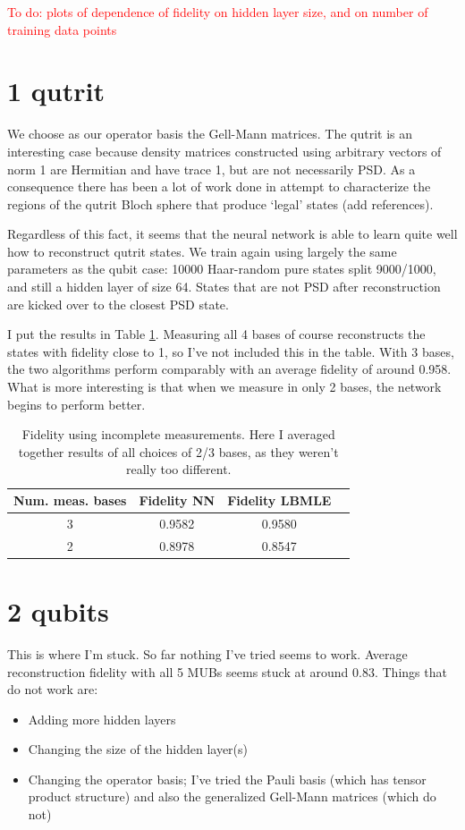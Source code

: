 \documentclass[a4paper,10pt]{article}
\begin{document}
\textcolor{red}{To do: plots of dependence of fidelity on hidden layer size, and on number of training data points}

\section{1 qutrit}

We choose as our operator basis the Gell-Mann matrices. The qutrit is an interesting case because density matrices constructed using arbitrary vectors of norm 1 are Hermitian and have trace 1, but are not necessarily PSD. As a consequence there has been a lot of work done in attempt to characterize the regions of the qutrit Bloch sphere that produce `legal' states (add references).

Regardless of this fact, it seems that the neural network is able to learn quite well how to reconstruct qutrit states. We train again using largely the same parameters as the qubit case: 10000 Haar-random pure states split 9000/1000, and still a hidden layer of size 64. States that are not PSD after reconstruction are kicked over to the closest PSD state.

I put the results in Table \ref{tab:qutrit}. Measuring all 4 bases of course reconstructs the states with fidelity close to 1, so I've not included this in the table. With 3 bases, the two algorithms perform comparably with an average fidelity of around 0.958. What is more interesting is that when we measure in only 2 bases, the network begins to perform better.

\begin{table}[h!]
 \centering
 \begin{tabular}{|c||c|c|c|}
 \hline
  Num. meas. bases &  Fidelity NN & Fidelity LBMLE \\ \hline
  3 & 0.9582 &  0.9580 \\
  2 & 0.8978 & 0.8547  \\ \hline
 \end{tabular}
 \caption{Fidelity using incomplete measurements. Here I averaged together results of all choices of 2/3 bases, as they weren't really too different.}
 \label{tab:qutrit}
\end{table}

\section{2 qubits}

This is where I'm stuck. So far nothing I've tried seems to work. Average reconstruction fidelity with all 5 MUBs seems stuck at around 0.83. Things that do not work are:
\begin{itemize}
 \item Adding more hidden layers
 \item Changing the size of the hidden layer(s)
 \item Changing the operator basis; I've tried the Pauli basis (which has tensor product structure) and also the generalized Gell-Mann matrices (which do not)
\end{itemize}
\end{document}
